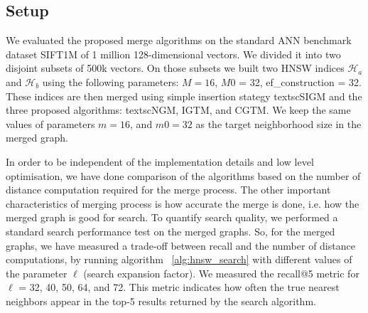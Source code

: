 \documentclass{article}
\begin{document}


\subsection{Setup}

We evaluated the proposed merge algorithms on the standard ANN benchmark dataset SIFT1M of 1 million 128-dimensional vectors. We divided it into two disjoint subsets of 500k vectors. On those subsets we built two HNSW indices $\mathcal{H}_a$ and $\mathcal{H}_b$ using the following parameters: $M = 16$, $M0$ = 32, ef\_construction = 32.
These indices are then merged using simple insertion stategy textsc{SIGM} and the three proposed algorithms: textsc{NGM}, \textsc{IGTM}, and \textsc{CGTM}. We keep the same values of parameters $m = 16$, and $m0 = 32$  as the target neighborhood size in the merged graph.

In order to be independent of the implementation details and low level optimisation, we have done comparison of the algorithms based on the number of distance computation required for the merge process. The other important characteristics of merging process is how accurate the merge is done, i.e. how the merged graph is good for search. To quantify search quality, we performed a standard search performance test on the merged graphs. So, for the merged graphs, we have measured a trade-off between recall and the number of distance computations, by running algorithm ~\ref{alg:hnsw_search} with different values of the parameter $\ell$ (search expansion factor). We measured the recall@5 metric for $\ell$ = 32, 40, 50, 64, and 72. This metric indicates how often the true nearest neighbors appear in the top-5 results returned by the search algorithm.
\end{document}

